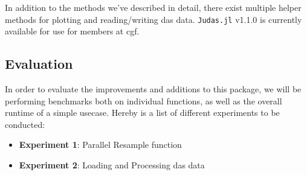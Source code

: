 

In addition to the methods we've described in detail, there exist multiple helper methods for plotting and reading/writing \acrshort{das} data. \texttt{Judas.jl} v1.1.0 is currently available for use for members at \acrshort{cgf}. 

\subsection{Evaluation}

In order to evaluate the improvements and additions to this package, we will be performing benchmarks both on individual functions, as well as the overall runtime of a simple usecase. Hereby is a list of different experiments to be conducted:

\begin{itemize}
    \item \textbf{Experiment 1}: Parallel Resample function
    \item \textbf{Experiment 2}: Loading and Processing \acrshort{das} data
\end{itemize}